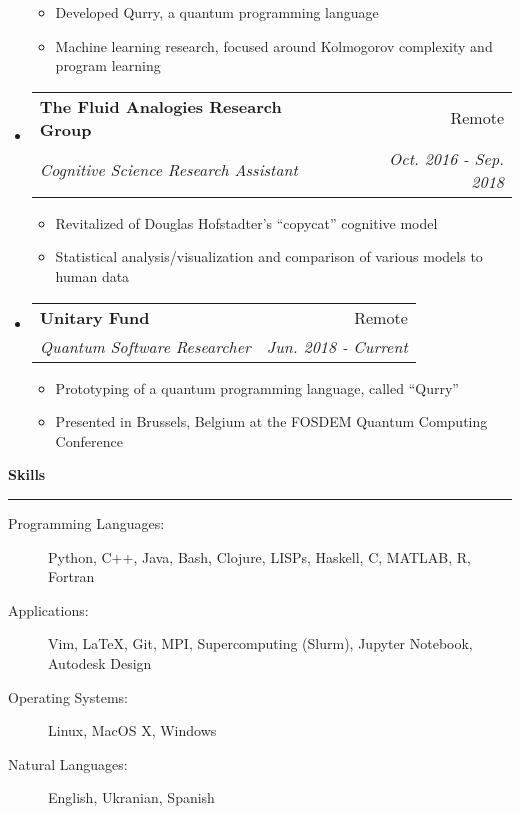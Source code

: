 \documentclass[letterpaper,11pt]{article}
\makeatletter
\newcommand{\sectionline}{
    \noindent\rule[0.5ex]{\linewidth}{0.5pt}
}
\newcommand{\resitem}[1]{\item #1 \vspace{-3pt}}
\newcommand{\resheading}[1]{
    {\large \textbf{#1}}
    \sectionline
}
\newcommand{\colfill}{@{\extracolsep{\fill}}}
\newcommand{\ressubheading}[4]{
\begin{tabular*}{6.5in}{l\colfill r}
		\textbf{#1} & #2 \\
		\textit{#3} & \textit{#4} \\
\end{tabular*}\vspace{-6pt}}
\makeatother
\begin{document}
\begin{itemize}
\begin{itemize}
        \resitem{Developed Qurry, a quantum programming language}
        \resitem{Machine learning research, focused around Kolmogorov complexity and program learning}
 	\end{itemize}
 \item
    \ressubheading{The Fluid Analogies Research Group}{Remote}{Cognitive Science Research Assistant}{Oct. 2016 - Sep. 2018}
 	\begin{itemize}
 		\resitem{Revitalized of Douglas Hofstadter's ``copycat'' cognitive model}
 		\resitem{Statistical analysis/visualization and comparison of various models to human data}
 	\end{itemize}
 \item
     \ressubheading{Unitary Fund}{Remote}{Quantum Software Researcher}{Jun. 2018 - Current}
 	\begin{itemize}
            \resitem{Prototyping of a quantum programming language, called ``Qurry''}
            \resitem{Presented in Brussels, Belgium at the FOSDEM Quantum Computing Conference}
 	\end{itemize}
\end{itemize}

\resheading{Skills}
\begin{description}
    \item[Programming Languages:] 
        Python, C++, Java, Bash, Clojure, LISPs, Haskell, C, MATLAB, R, Fortran
    \item[Applications:]
        Vim, \LaTeX, Git, MPI, Supercomputing (Slurm), Jupyter Notebook, Autodesk Design 
    \item[Operating Systems:]
        Linux, MacOS X, Windows
    \item[Natural Languages:] 
        English, Ukranian, Spanish
\end{description}
\end{document}

